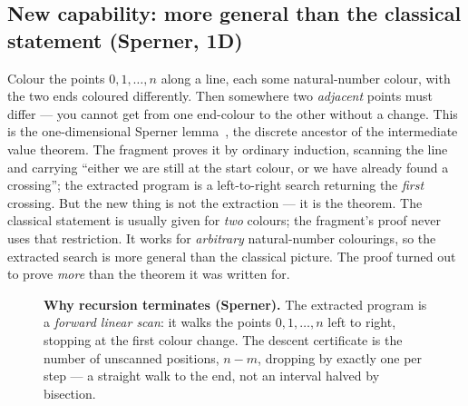 \documentclass[11pt]{article}
\begin{document}
\subsection*{New capability: more general than the classical statement (Sperner, 1D)}

Colour the points $0,1,\dots,n$ along a line, each some natural-number colour,
with the two ends coloured differently. Then somewhere two \emph{adjacent}
points must differ --- you cannot get from one end-colour to the other without a
change. This is the one-dimensional Sperner lemma~\citep{sperner1928}, the
discrete ancestor of the intermediate value theorem. The fragment proves it by ordinary induction,
scanning the line and carrying ``either we are still at the start colour, or we
have already found a crossing''; the extracted program is a left-to-right search
returning the \emph{first} crossing. But the new thing is not the extraction ---
it is the theorem. The classical statement is usually given for \emph{two}
colours; the fragment's proof never uses that restriction. It works for
\emph{arbitrary} natural-number colourings, so the extracted search is more
general than the classical picture. The proof turned out to prove \emph{more}
than the theorem it was written for.

\begin{figure}[h]
\centering
{}
\caption{\textbf{Why recursion terminates (Sperner).} The extracted program is a
\emph{forward linear scan}: it walks the points $0,1,\dots,n$ left to right,
stopping at the first colour change. The descent certificate is the number of
unscanned positions, $n-m$, dropping by exactly one per step --- a straight walk
to the end, not an interval halved by bisection.}
\label{fig:desc-sperner}
\end{figure}
\end{document}
